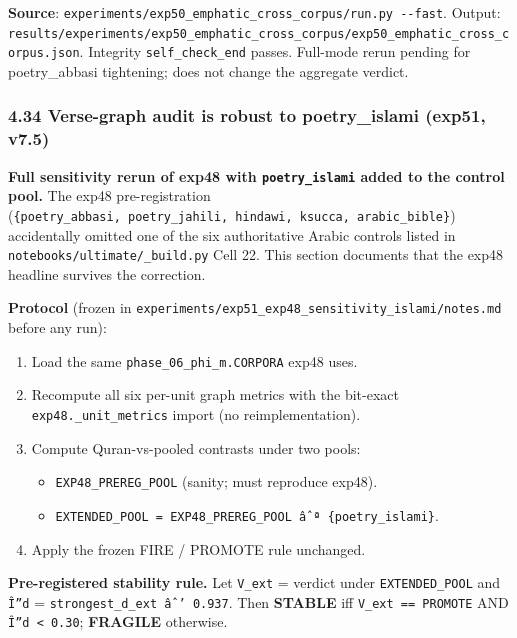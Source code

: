 \documentclass[
]{article}
\providecommand{\tightlist}{%
  \setlength{\itemsep}{0pt}\setlength{\parskip}{0pt}}
\begin{document}
\textbf{Source}:
\texttt{experiments/exp50\_emphatic\_cross\_corpus/run.py\ -\/-fast}.
Output:
\texttt{results/experiments/exp50\_emphatic\_cross\_corpus/exp50\_emphatic\_cross\_corpus.json}.
Integrity \texttt{self\_check\_end} passes. Full-mode rerun pending for
poetry\_abbasi tightening; does not change the aggregate verdict.

\subsubsection{4.34 Verse-graph audit is robust to poetry\_islami
(exp51,
v7.5)}\label{verse-graph-audit-is-robust-to-poetry_islami-exp51-v7.5}

\textbf{Full sensitivity rerun of exp48 with \texttt{poetry\_islami}
added to the control pool.} The exp48 pre-registration
(\texttt{\{poetry\_abbasi,\ poetry\_jahili,\ hindawi,\ ksucca,\ arabic\_bible\}})
accidentally omitted one of the six authoritative Arabic controls listed
in \texttt{notebooks/ultimate/\_build.py} Cell 22. This section
documents that the exp48 headline survives the correction.

\textbf{Protocol} (frozen in
\texttt{experiments/exp51\_exp48\_sensitivity\_islami/notes.md} before
any run):

\begin{enumerate}
\def\labelenumi{\arabic{enumi}.}
\tightlist
\item
  Load the same \texttt{phase\_06\_phi\_m.CORPORA} exp48 uses.
\item
  Recompute all six per-unit graph metrics with the bit-exact
  \texttt{exp48.\_unit\_metrics} import (no reimplementation).
\item
  Compute Quran-vs-pooled contrasts under two pools:

  \begin{itemize}
  \tightlist
  \item
    \texttt{EXP48\_PREREG\_POOL} (sanity; must reproduce exp48).
  \item
    \texttt{EXTENDED\_POOL\ =\ EXP48\_PREREG\_POOL\ âˆª\ \{poetry\_islami\}}.
  \end{itemize}
\item
  Apply the frozen FIRE / PROMOTE rule unchanged.
\end{enumerate}

\textbf{Pre-registered stability rule.} Let \texttt{V\_ext} = verdict
under \texttt{EXTENDED\_POOL} and \texttt{Î”d} =
\texttt{strongest\_d\_ext\ âˆ’\ 0.937}. Then \textbf{STABLE} iff
\texttt{V\_ext\ ==\ PROMOTE} AND
\texttt{\textbar{}Î”d\textbar{}\ \textless{}\ 0.30}; \textbf{FRAGILE}
otherwise.
\end{document}
